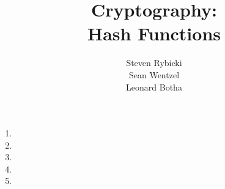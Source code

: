 \documentclass[12pt,a4paper]{article}
\title{{\bf Cryptography:}\\
Hash Functions}
\author{Steven Rybicki\\
Sean Wentzel\\
Leonard Botha}
\begin{document}
\maketitle
\begin{enumerate}
\item 
\item 
\item 
\item 
\item 
\end{enumerate}

\end{document}
